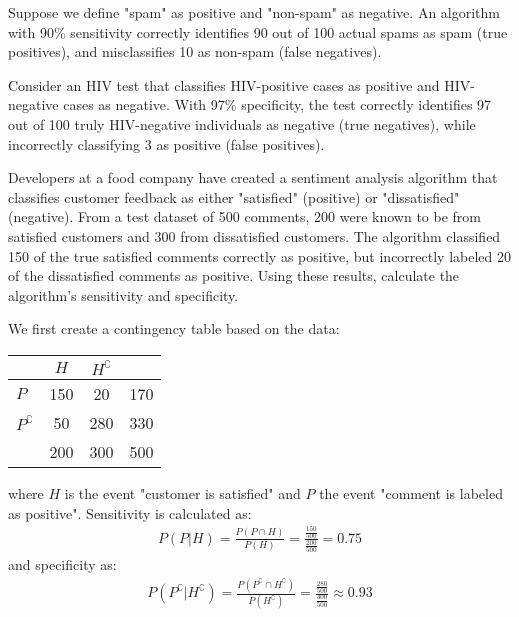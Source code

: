 \begin{exmp}
	Suppose we define "spam" as positive and "non-spam" as negative.
	An algorithm with 90\% sensitivity correctly identifies 90 out of 100 actual spams as spam (true positives), and misclassifies 10 as non-spam (false negatives).
\end{exmp}

\begin{exmp}
	Consider an HIV test that classifies HIV-positive cases as positive and HIV-negative cases as negative.
	With 97\% specificity, the test correctly identifies 97 out of 100 truly HIV-negative individuals as negative (true negatives),
	while incorrectly classifying 3 as positive (false positives).
\end{exmp}

\begin{exmp}
	Developers at a food company have created a sentiment analysis algorithm that classifies customer feedback as either "satisfied" (positive) or "dissatisfied" (negative).
	From a test dataset of 500 comments, 200 were known to be from satisfied customers and 300 from dissatisfied customers.
	The algorithm classified 150 of the true satisfied comments correctly as positive,
	but incorrectly labeled 20 of the dissatisfied comments as positive.
	Using these results, calculate the algorithm's sensitivity and specificity.
\end{exmp}
\begin{solution}
	We first create a contingency table based on the data:
	\begin{center}
	\begin{tabular}{l|cc|c}
						& \( H \) & \( H^\complement \) &  \\ \hline
	\( P \)                & 150 & 20 & 170\\ 
	\( P^\complement \)    & 50 & 280 & 330 \\ \hline
						& 200 & 300 & 500
	\end{tabular}
	\end{center}
	where \( H \) is the event "customer is satisfied" and \( P \) the event "comment is labeled as positive".
	Sensitivity is calculated as:
	\begin{gather*}
		P(P | H) = \frac{P(P \cap H)}{P(H)} = \frac{\frac{150}{500}}{\frac{200}{500}} = 0.75
	\end{gather*}
	and specificity as:
	\begin{gather*}
		P(P^\complement | H^\complement) = \frac{P(P^\complement \cap H^\complement)}{P(H^\complement)} = \frac{\frac{280}{500}}{\frac{300}{500}} \approx 0.93
	\end{gather*}
\end{solution}

